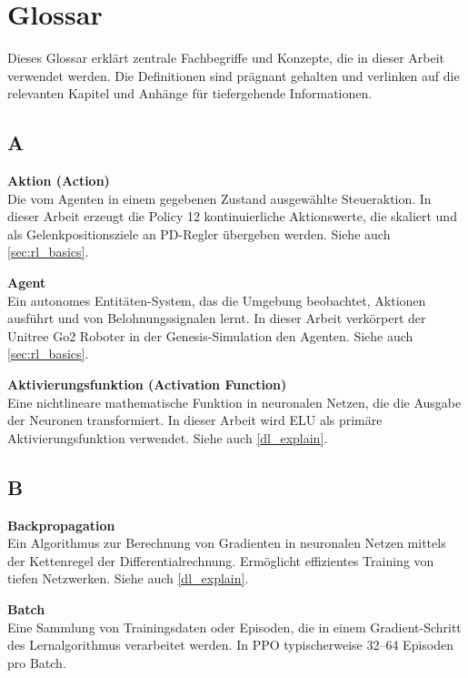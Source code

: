 \chapter{Glossar}\label{ch:glossar}

Dieses Glossar erklärt zentrale Fachbegriffe und Konzepte, die in dieser Arbeit verwendet werden. Die Definitionen sind prägnant gehalten und verlinken auf die relevanten Kapitel und Anhänge für tiefergehende Informationen.

\section*{A}

\vspace{0.3cm}
\noindent\textbf{Aktion (Action)} \\
Die vom Agenten in einem gegebenen Zustand ausgewählte Steueraktion. In dieser Arbeit erzeugt die Policy 12 kontinuierliche Aktionswerte, die skaliert und als Gelenkpositionsziele an PD-Regler übergeben werden. Siehe auch \autoref{sec:rl_basics}.

\vspace{0.5cm}
\noindent\textbf{Agent} \\
Ein autonomes Entitäten-System, das die Umgebung beobachtet, Aktionen ausführt und von Belohnungssignalen lernt. In dieser Arbeit verkörpert der Unitree Go2 Roboter in der Genesis-Simulation den Agenten. Siehe auch \autoref{sec:rl_basics}.

\vspace{0.5cm}
\noindent\textbf{Aktivierungsfunktion (Activation Function)} \\
Eine nichtlineare mathematische Funktion in neuronalen Netzen, die die Ausgabe der Neuronen transformiert. In dieser Arbeit wird ELU als primäre Aktivierungsfunktion verwendet. Siehe auch \autoref{dl_explain}.

\section*{B}

\vspace{0.3cm}
\noindent\textbf{Backpropagation} \\
Ein Algorithmus zur Berechnung von Gradienten in neuronalen Netzen mittels der Kettenregel der Differentialrechnung. Ermöglicht effizientes Training von tiefen Netzwerken. Siehe auch \autoref{dl_explain}.

\vspace{0.5cm}
\noindent\textbf{Batch} \\
Eine Sammlung von Trainingsdaten oder Episoden, die in einem Gradient-Schritt des Lernalgorithmus verarbeitet werden. In PPO typischerweise 32–64 Episoden pro Batch.

